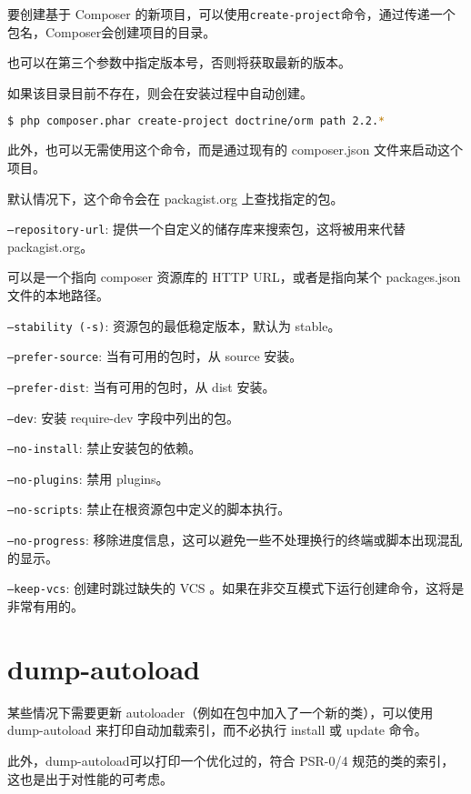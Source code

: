 要创建基于 Composer 的新项目，可以使用\texttt{create-project}命令，通过传递一个包名，Composer会创建项目的目录。

也可以在第三个参数中指定版本号，否则将获取最新的版本。


如果该目录目前不存在，则会在安装过程中自动创建。

\begin{lstlisting}[language=bash]
$ php composer.phar create-project doctrine/orm path 2.2.*
\end{lstlisting}

此外，也可以无需使用这个命令，而是通过现有的 composer.json 文件来启动这个项目。

默认情况下，这个命令会在 packagist.org 上查找指定的包。

\begin{compactitem}
\item \texttt{--repository-url}: 提供一个自定义的储存库来搜索包，这将被用来代替 packagist.org。

可以是一个指向 composer 资源库的 HTTP URL，或者是指向某个 packages.json 文件的本地路径。
\item \texttt{--stability (-s)}: 资源包的最低稳定版本，默认为 stable。
\item \texttt{--prefer-source}: 当有可用的包时，从 source 安装。
\item \texttt{--prefer-dist}: 当有可用的包时，从 dist 安装。
\item \texttt{--dev}: 安装 require-dev 字段中列出的包。
\item \texttt{--no-install}: 禁止安装包的依赖。
\item \texttt{--no-plugins}: 禁用 plugins。
\item \texttt{--no-scripts}: 禁止在根资源包中定义的脚本执行。
\item \texttt{--no-progress}: 移除进度信息，这可以避免一些不处理换行的终端或脚本出现混乱的显示。
\item \texttt{--keep-vcs}: 创建时跳过缺失的 VCS 。如果在非交互模式下运行创建命令，这将是非常有用的。
\end{compactitem}

\section{dump-autoload}

某些情况下需要更新 autoloader（例如在包中加入了一个新的类），可以使用 dump-autoload 来打印自动加载索引，而不必执行 install 或 update 命令。

此外，dump-autoload可以打印一个优化过的，符合 PSR-0/4 规范的类的索引，这也是出于对性能的可考虑。

